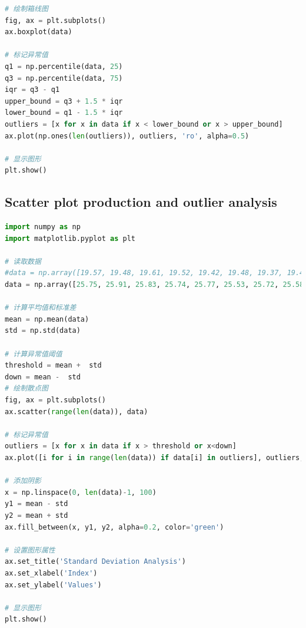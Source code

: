 \documentclass[UTF8]{article}
\begin{document}
\begin{appendix}
\begin{lstlisting}[language=python]
# 绘制箱线图
fig, ax = plt.subplots()
ax.boxplot(data)

# 标记异常值
q1 = np.percentile(data, 25)
q3 = np.percentile(data, 75)
iqr = q3 - q1
upper_bound = q3 + 1.5 * iqr
lower_bound = q1 - 1.5 * iqr
outliers = [x for x in data if x < lower_bound or x > upper_bound]
ax.plot(np.ones(len(outliers)), outliers, 'ro', alpha=0.5)

# 显示图形
plt.show()
		\end{lstlisting}
		
	\subsection{Scatter plot production and outlier analysis}
		\begin{lstlisting}[language=python]
import numpy as np
import matplotlib.pyplot as plt

# 读取数据
#data = np.array([19.57, 19.48, 19.61, 19.52, 19.42, 19.48, 19.37, 19.43, 19.51])
data = np.array([25.75, 25.91, 25.83, 25.74, 25.77, 25.53, 25.72, 25.58, 25.59])

# 计算平均值和标准差
mean = np.mean(data)
std = np.std(data)

# 计算异常值阈值
threshold = mean +  std
down = mean -  std
# 绘制散点图
fig, ax = plt.subplots()
ax.scatter(range(len(data)), data)

# 标记异常值
outliers = [x for x in data if x > threshold or x<down]
ax.plot([i for i in range(len(data)) if data[i] in outliers], outliers, 'ro', alpha=0.5)

# 添加阴影
x = np.linspace(0, len(data)-1, 100)
y1 = mean - std
y2 = mean + std
ax.fill_between(x, y1, y2, alpha=0.2, color='green')

# 设置图形属性
ax.set_title('Standard Deviation Analysis')
ax.set_xlabel('Index')
ax.set_ylabel('Values')

# 显示图形
plt.show()

		\end{lstlisting}

\end{appendix}
\end{document}
